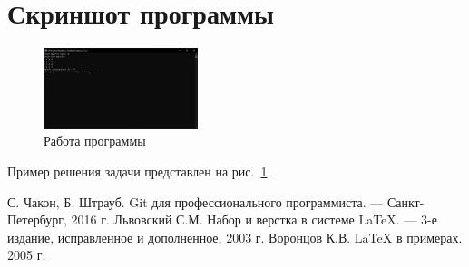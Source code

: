 \documentclass[12pt,a4paper]{scrartcl}
\begin{document}
\section{Скриншот программы}
\label{sec:picexample}
\begin{figure}[h]
	\centering
	\includegraphics[width=0.4\textwidth]{practice.jpg}
	\caption{Работа программы}\label{fig:pra}
\end{figure}

Пример решения задачи представлен на рис.~\ref{fig:pra}.

\begin{thebibliography}{9}
С. Чакон, Б. Штрауб. Git для профессионального программиста. \newblock --- Санкт-Петербург, 2016 г.
Львовский С.М. Набор и верстка в системе \LaTeX{}. \newblock --- 3-е издание, исправленное и дополненное, 2003 г.
Воронцов К.В. \LaTeX{} в примерах. 2005 г.
\end{thebibliography}
\end{document}
